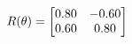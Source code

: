 \documentclass[preview]{standalone}
\begin{document}
\begin{align*}
\special{dvisvgm:raw <g id='unique000'>}R(\theta) = \begin{bmatrix}0.80 & -0.60\\0.60 & 0.80\end{bmatrix}\special{dvisvgm:raw </g>}
\end{align*}
\end{document}
